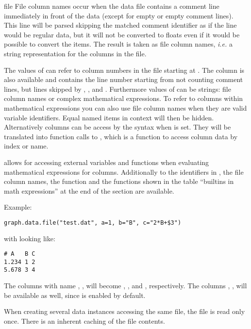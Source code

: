 \begin{classdesc}{file}
  File column names occur when the data file contains a comment line
  immediately in front of the data (except for empty or empty comment
  lines). This line will be parsed skipping the matched comment
  identifier as if the line would be regular data, but it will not be
  converted to floats even if it would be possible to convert the
  items. The result is taken as file column names, \emph{i.e.} a
  string representation for the columns in the file.

  The values of  can refer to column numbers in the
  file starting at . The column  is also available
  and contains the line number starting from  not counting
  comment lines, but lines skipped by , ,
  and . Furthermore values of  can be
  strings: file column names or complex mathematical expressions. To
  refer to columns within mathematical expressions you can also use
  file column names when they are valid variable identifiers. Equal
  named items in context will then be hidden. Alternatively columns
  can be access by the syntax 
  when  is set. They will be translated into
  function calls to , which is a function to
  access column data by index or name.

   allows for accessing external variables and functions
  when evaluating mathematical expressions for columns. Additionally
  to the identifiers in , the file column names, the
   function and the functions shown in the table
  ``builtins in math expressions'' at the end of the section are
  available.

  Example:
  \begin{verbatim}
graph.data.file("test.dat", a=1, b="B", c="2*B+$3")
  \end{verbatim}
  with  looking like:
  \begin{verbatim}
# A   B C
1.234 1 2
5.678 3 4
  \end{verbatim}
  The columns with name , ,  will become
  , , and , respectively. The columns , ,
   will be available as well, since  is enabled by
  default.

  When creating several data instances accessing the same file,
  the file is read only once. There is an inherent caching of the
  file contents.
\end{classdesc}

